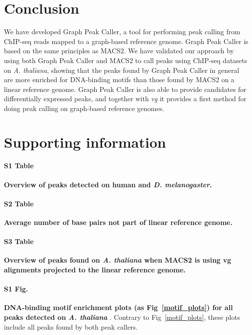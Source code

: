\documentclass[10pt,letterpaper]{article}
\begin{document}
\section*{Conclusion}
We have developed Graph Peak Caller, a tool for performing peak calling from ChIP-seq reads mapped to a graph-based reference genome. Graph Peak Caller is based on the same principles as MACS2. We have validated our approach by using both Graph Peak Caller and MACS2 to call peaks using ChIP-seq datasets on \emph{A. thaliana}, showing that the peaks found by Graph Peak Caller in general are more enriched for DNA-binding motifs than those found by MACS2 on a linear reference genome. Graph Peak Caller is also able to provide candidates for differentially expressed peaks, and together with \emph{vg} it provides a first method for doing peak calling on graph-based reference genomes.

\section*{Supporting information}

\paragraph*{S1 Table}
\label{S1_Table}
{\bf Overview of peaks detected on human and \emph{D. melanogaster}.}

\paragraph*{S2 Table}
\label{S2_Table}
{\bf Average number of base pairs not part of linear reference genome.}

\paragraph*{S3 Table}
\label{S3_Table}
{\bf Overview of peaks found on \emph{A. thaliana} when MACS2 is using vg alignments projected to the linear reference genome.}

\paragraph*{S1 Fig.}
\label{S1_Fig}
{\bf DNA-binding motif enrichment plots (as Fig~\ref{motif_plots})  for all peaks detected on \emph{A. thaliana} }. Contrary to Fig~\ref{motif_plots}, these plots include all peaks found by both peak callers.
\end{document}
